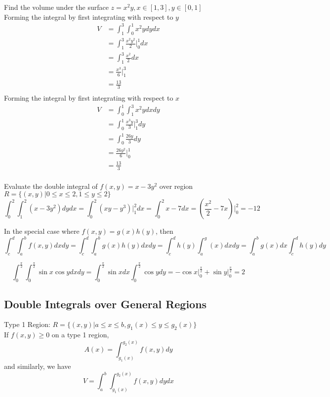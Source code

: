 \documentclass[12pt]{article}
\begin{document}
\begin{ex}
 Find the volume under the surface $z = x^2y, x \in [1,3], y \in [0,1]$ \\
Forming the integral by first integrating with respect to $y$
\begin{align*}
 V &= \int_1^3 \int_0^1 x^2y dydx \\
 &= \int_1^3 \frac{x^2y^2}{2} \Big |_0^1 dx \\
 &= \int_1^3 \frac{x^2}{2} dx \\
 &= \frac{x^3}{6} \Big |_1^3 \\
 &= \frac{13}{3} \\
\end{align*}
Forming the integral by first integrating with respect to $x$
\begin{align*}
 V &= \int_0^1 \int_1^3 x^2y dxdy \\
&= \int_0^1 \frac{x^3y}{3} \Big |_1^3 dy \\
&= \int_0^1 \frac{26y}{3} dy \\
&= \frac{26y^2}{6} \Big |_0^1 \\
&= \frac{13}{3} \\
\end{align*}
\end{ex}

\begin{ex}
 Evaluate the double integral of $f(x,y) = x - 3y^2$ over region $R = \{(x,y)| 0 \leq x \leq 2, 1 \leq y \leq 2\}$
 $$\int_0^2 \int_1^2 (x-3y^2) dydx = \int_0^2 (xy - y^3) \Big |_1^2 dx = \int_0^2 x - 7 dx = \left(\frac{x^2}{2} - 7x\right) \Big |_0^2 = -12$$
\end{ex}

In the special case where $f(x,y) = g(x)h(y)$, then
$$\int_c^d \int_a^b f(x,y) dxdy = \int_c^d \int_a^b g(x)h(y)dxdy = \int_c^d h(y) \int_a^ g(x)dx dy = \int_a^b g(x)dx \int_c^d h(y)dy$$

\begin{ex}
$$ \int_0^{\frac{\pi}{2}} \int_0^{\frac{\pi}{2}} \sin x \cos y dxdy = \int_0^{\frac{\pi}{2}} \sin x dx \int_0^{\frac{\pi}{2}} \cos y dy = -\cos x \Big |_0^{\frac{\pi}{2}} + \sin y \Big |_0^{\frac{\pi}{2}} = 2$$
\end{ex}

\subsection{Double Integrals over General Regions}

Type 1 Region: $R = \{(x,y)| a \leq x \leq b, g_1(x) \leq y \leq g_2(x)\}$ \\
If $f(x,y) \geq 0$ on a type 1 region,
$$A(x) = \int_{g_1(x)}^{g_2(x)} f(x,y) dy$$
and similarly, we have
$$V = \int_a^b \int_{g_1(x)}^{g_2(x)} f(x,y) dydx$$
\end{document}
